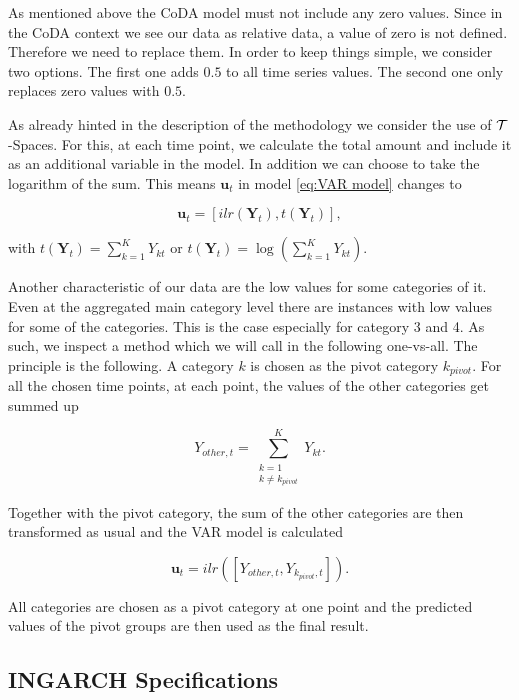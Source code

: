 As mentioned above the CoDA model must not include any zero values. Since in the CoDA context we see our data as relative data, a value of zero is not defined. Therefore we need to replace them. In order to keep things simple, we consider two options. The first one adds $0.5$ to all time series values. The second one only replaces zero values with $0.5$.

As already hinted in the description of the methodology we consider the use of $\mathcal{T}$-Spaces. For this, at each time point, we calculate the total amount and include it as an additional variable in the model. In addition we can choose to take the logarithm of the sum. This means $\bm{u}_t$ in model \ref{eq:VAR model} changes to 

\begin{equation}
\bm{u}_t = [ilr(\bm{Y}_t),t(\bm{Y}_t)],
\label{eq:Tspace u}
\end{equation}

with $t(\bm{Y}_t) = \sum_{k=1}^K Y_{kt}$ or $t(\bm{Y}_t) = \log\left(\sum_{k=1}^K Y_{kt}\right)$.

Another characteristic of our data are the low values for some categories of it. Even at the aggregated main category level there are instances with low values for some of the categories. This is the case especially for category 3 and 4. As such, we inspect a method which we will call in the following one-vs-all. The principle is the following. A category $k$ is chosen as the pivot category $k_{pivot}$. For all the chosen time points, at each point, the values of the other categories get summed up

\begin{equation}
Y_{other,t} = \sum_{\substack{k=1 \\ k \neq k_{pivot}}}^K Y_{kt}.
\label{eq:one vs all}
\end{equation}

Together with the pivot category, the sum of the other categories are then transformed as usual and the VAR model is calculated 

\begin{equation}
\bm{u}_t = ilr([Y_{other,t}, Y_{k_{pivot},t}]).
\label{eq:one vs all ilr}
\end{equation}


All categories are chosen as a pivot category at one point and the predicted values of the pivot groups are then used as the final result. 


\subsection{INGARCH Specifications}
\label{sec: Ingarch Specifications}

